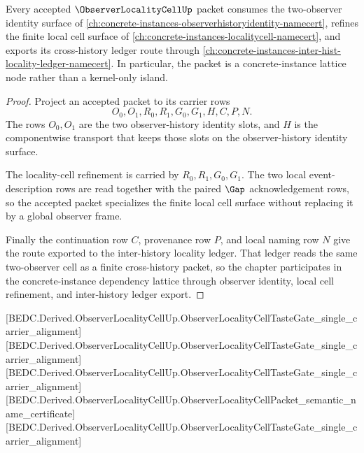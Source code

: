\begin{theorem}
\label{thm:observer-locality-cell-sibling-lattice-link}
Every accepted $\ObserverLocalityCellUp$ packet consumes the two-observer identity surface of \autoref{ch:concrete-instances-observerhistoryidentity-namecert}, refines the finite local cell surface of \autoref{ch:concrete-instances-localitycell-namecert}, and exports its cross-history ledger route through \autoref{ch:concrete-instances-inter-hist-locality-ledger-namecert}. In particular, the packet is a concrete-instance lattice node rather than a kernel-only island.
\end{theorem}
\begin{proof}
Project an accepted packet to its carrier rows
$$
O_0,O_1,R_0,R_1,G_0,G_1,H,C,P,N.
$$
The rows $O_0,O_1$ are the two observer-history identity slots, and $H$ is the componentwise transport that keeps those slots on the observer-history identity surface.

The locality-cell refinement is carried by $R_0,R_1,G_0,G_1$. The two local event-description rows are read together with the paired $\Gap$ acknowledgement rows, so the accepted packet specializes the finite local cell surface without replacing it by a global observer frame.

Finally the continuation row $C$, provenance row $P$, and local naming row $N$ give the route exported to the inter-history locality ledger. That ledger reads the same two-observer cell as a finite cross-history packet, so the chapter participates in the concrete-instance dependency lattice through observer identity, local cell refinement, and inter-history ledger export.
\end{proof}

[BEDC.Derived.ObserverLocalityCellUp.ObserverLocalityCellTasteGate\_single\_carrier\_alignment]
[BEDC.Derived.ObserverLocalityCellUp.ObserverLocalityCellTasteGate\_single\_carrier\_alignment]
[BEDC.Derived.ObserverLocalityCellUp.ObserverLocalityCellTasteGate\_single\_carrier\_alignment]
[BEDC.Derived.ObserverLocalityCellUp.ObserverLocalityCellPacket\_semantic\_name\_certificate]
[BEDC.Derived.ObserverLocalityCellUp.ObserverLocalityCellTasteGate\_single\_carrier\_alignment]

